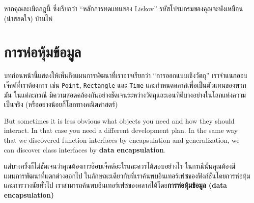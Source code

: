 

หากคุณละเมิดกฎนี้ ซึ่งเรียกว่า ``หลักการทดแทนของ Liskov'' รหัสโปรแกรมของคุณจะพังเหมือน (น่าสลดใจ) บ้านไพ่


\section{การห่อหุ้มข้อมูล} %

บทก่อนหน้านี้แสดงให้เห็นถึงแผนการพัฒนาที่เราอาจเรียกว่า ``การออกแบบเชิงวัตถุ'' เราจำแนกออบเจ๊คต์ที่เราต้องการ  เช่น {\tt Point}, {\tt Rectangle} และ {\tt Time}
และกำหนดคลาสเพื่อเป็นตัวแทนของพวกมัน ในแต่ละกรณี มีความสอดคล้องกันอย่างชัดเจนระหว่างวัตถุและเอนทิตีบางอย่างในโลกแห่งความเป็นจริง (หรืออย่างน้อยก็โลกทางคณิตศาสตร์)


But sometimes it is less obvious what objects you need
and how they should interact.  In that case you need a different
development plan.  In the same way that we discovered function
interfaces by encapsulation and generalization, we can discover
class interfaces by {\bf data encapsulation}.

แต่บางครั้งก็ไม่ชัดเจนว่าคุณต้องการอ๊อบเจ็คต์อะไรและควรโต้ตอบอย่างไร ในกรณีนั้นคุณต้องมีแผนการพัฒนาที่แตกต่างออกไป 
ในลักษณะเดียวกับที่เราค้นพบอินเทอร์เฟซของฟังก์ชันโดยการห่อหุ้มและการวางนัยทั่วไป เราสามารถค้นพบอินเทอร์เฟซของคลาสได้โดย{\bf การห่อหุ้มข้อมูล (data encapsulation)}


